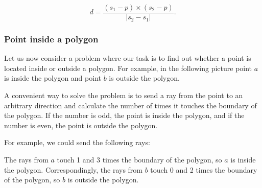 \[ d = \frac{(s_1-p) \times (s_2-p)}{|s_2-s_1|} .\]

\subsubsection{Point inside a polygon}

Let us now consider a problem where our task is to
find out whether a point is located inside or outside
a polygon.
For example, in the following picture point $a$
is inside the polygon and point $b$ is outside
the polygon.

\begin{center}
\end{center}

A convenient way to solve the problem is to
send a ray from the point to an arbitrary direction
and calculate the number of times it touches
the boundary of the polygon.
If the number is odd,
the point is inside the polygon,
and if the number is even,
the point is outside the polygon.

\begin{samepage}
For example, we could send the following rays:
\begin{center}
\end{center}
\end{samepage}

The rays from $a$ touch 1 and 3 times
the boundary of the polygon,
so $a$ is inside the polygon.
Correspondingly, the rays from $b$
touch 0 and 2 times the boundary of the polygon,
so $b$ is outside the polygon.

